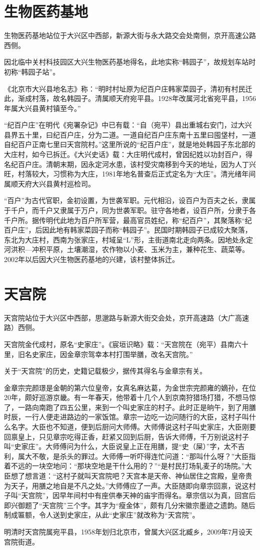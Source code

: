 \section{生物医药基地}
生物医药基地站位于大兴区中西部，新源大街与永大路交会处南侧，京开高速公路西侧。

因北临中关村科技园区大兴生物医药基地得名，此地实称“韩园子”，故规划车站时初称“韩园子站”。

《北京市大兴县地名志》称：“明时村址原为纪百户庄韩家菜园子，清初有村民迁此，渐成村落，故名韩园子。清属顺天府宛平县。1928年改属河北省宛平县，1956年属大兴县黄村镇至今。”

“纪百户庄”在明代《宛署杂记》中已有载：“自（宛平）县出重城右安门，过大兴县界五十里，曰纪百户庄，分为二道。一道自纪百户庄东南十五里曰囤垡村，一道自纪百户正南七里曰天宫院村。”这里所说的“纪百户庄”，就是地处韩园子东北部的大庄村，如今已拆迁。《大兴史话》载：大庄明代成村，曾因纪姓以功封百户，得名纪百户庄。清朝末期，因永定河水患，该村受灾南移到今天的地址，因为人丁兴旺，村落较大，习惯称为大庄，1981年地名普查后正式定名为“大庄”。清光绪年间属顺天府大兴县黄村巡检司。

“百户”为古代官职，金初设置，为世袭军职。元代相沿，设百户为百夫之长，隶属于千户，而千户又隶属于万户，同为世袭军职。驻守各地者，设百户所，分隶于各千户所。据传明代此地为百户所军营，最高官员姓纪，称“纪百户”，其聚落称“纪百户庄”，后因此地有韩家菜园子而称“韩园子”。民国时期韩园子已成较大聚落，东北为大庄村，西南为张家庄，村域呈“L”形，主街道南北走向两条。因地处永定河洪积—冲积平原，土壤潮湿，农作物以小麦、玉米为主，兼种花生、蔬菜等。2002年以后因大兴生物医药基地的兴建，该村整体拆迁。

\section{天宫院}
天宫院站位于大兴区中西部，思邈路与新源大街交会处，京开高速路（大广高速路）西侧。

天宫院金代成村，原名“史家庄”。《宸垣识略》载：“天宫院在（宛平）县南六十里，旧名史家庄，因金章宗驾幸本村打围举膳，改名天宫院。”

关于“天宫院”的历史，史籍记载极少，据传其得名与金章宗有关。

金章宗完颜璟是金朝的第六位皇帝，女真名麻达葛，为金世宗完颜雍的嫡孙，在位20年，颇好巡游京畿。有一年春天，他带着十几个人到京南狩猎场打猎，不想马惊了，一路向南跑了四五公里，来到一个叫史家庄的村子。此时正是晌午，到了用膳时辰，一行人便走进路边的一家饭馆。章宗一边吃一边问随行的大臣，这村子叫什么名字。大臣也不知道，便到后厨问大师傅。大师傅说这村子叫史家庄，大臣刚要回禀皇上，只见章宗吃得正香，赶紧又回到后厨，告诉大师傅，千万别说这村子叫“史家庄”。大师傅问为什么，大臣说皇上正在用膳，提“史（屎）”字，太不吉利，属大不敬，是杀头的罪过。大师傅一听吓得连忙问道：“那叫什么呀？”大臣指着不远的一块空地问：“那块空地是干什么用的？”“是村民打场轧麦子的场院。”大臣想了想言道：“这村子就叫天宫院吧？天宫本是天帝、神仙居住之宫殿，皇帝贵为天子，用膳之地自是不凡之处。”大师傅应了一声。大臣随即向章宗回禀，说这村子叫“天宫院”，因早年间村中有座供奉天神的庙宇而得名。章宗信以为真，回宫后即兴御题了“天宫院”三个字。其字为“瘦金体”，颇有几分宋徽宗墨迹之遗韵。随后制成匾额，令人送到史家庄，从此“史家庄”就改称为“天宫院”。

明清时天宫院属宛平县，1958年划归北京市，曾属大兴区北臧乡，2009年7月设天宫院街道。

